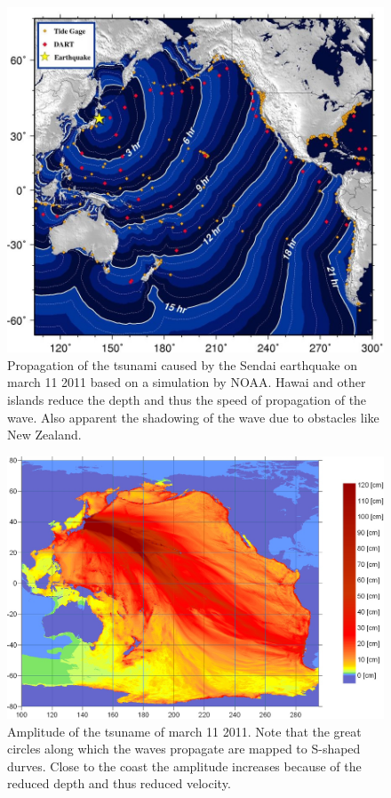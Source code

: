 \begin{figure}
\begin{center}
\includegraphics[width=\hsize]{../common/graphics/sendainoaa}
\end{center}
\caption{
Propagation of the tsunami caused by the Sendai earthquake on march 11 2011
based on a simulation by NOAA.
Hawai and other islands reduce the depth and thus the speed of propagation
of the wave.
Also apparent the shadowing of the wave due to obstacles like New Zealand.
\label{tsunamiausbreitung}}
\end{figure}

\begin{figure}
\begin{center}
\includegraphics[width=\hsize]{../common/graphics/sendaienergy}
\end{center}
\caption{
Amplitude of the tsuname of march 11 2011.
Note that the great circles along which the waves propagate are mapped
to S-shaped durves.
Close to the coast the amplitude increases because of the reduced depth
and thus reduced velocity.
\label{tsunamienergie}}
\end{figure}

